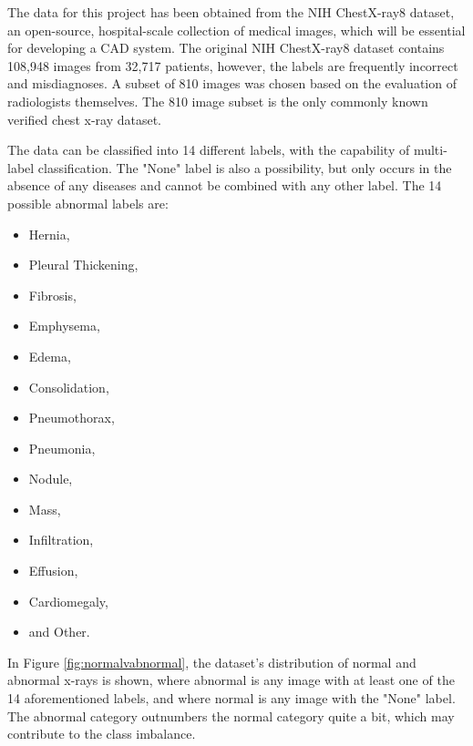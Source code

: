 \documentclass{article}
\theoremstyle{plain}
\theoremstyle{definition}
\theoremstyle{remark}
\begin{document}
The data for this project has been obtained from the NIH ChestX-ray8 dataset, an open-source,
hospital-scale collection of medical images, which will be essential for developing a CAD system.
The original NIH ChestX-ray8 dataset contains 108,948 images from 32,717 patients, however, the
labels are frequently incorrect and misdiagnoses.
A subset of 810 images was chosen based on the evaluation of radiologists themselves. The 810 image
subset is the only commonly known verified chest x-ray dataset. 

The data can be classified into 14 different labels, with the capability of multi-label classification.
The "None" label is also a possibility, but only occurs in the absence of any diseases and cannot be
combined with any other label. The 14 possible abnormal labels are: 
\begin{itemize}
    \item Hernia,
    \item Pleural Thickening,
    \item Fibrosis,
    \item Emphysema,
    \item Edema,
    \item Consolidation,
    \item Pneumothorax,
    \item Pneumonia,
    \item Nodule,
    \item Mass,
    \item Infiltration,
    \item Effusion,
    \item Cardiomegaly,
    \item and Other.
\end{itemize}

In Figure \ref{fig:normalvabnormal}, the dataset's distribution of normal and abnormal x-rays is shown,
where abnormal is any image with at least one of the 14 aforementioned labels, and where
normal is any image with the "None" label. The abnormal category outnumbers the normal category quite
a bit, which may contribute to the class imbalance.
\end{document}
